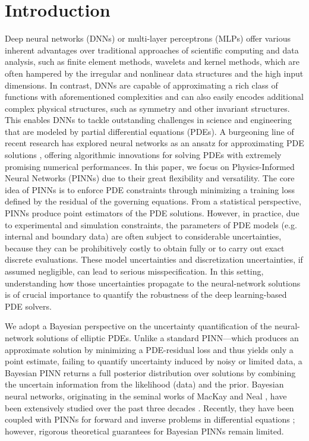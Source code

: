 \documentclass{article}
\theoremstyle{plain}
\theoremstyle{definition}
\theoremstyle{remark}
\begin{document}
\section{Introduction}
Deep neural networks (DNNs) or multi-layer perceptrons (MLPs) offer various inherent advantages over traditional approaches of scientific computing and data analysis, such as finite element methods, wavelets and kernel methods, which are often hampered by the irregular and nonlinear data structures and the high input dimensions. In contrast, DNNs are capable of approximating a rich class of functions with aforementioned complexities and  can also easily encodes additional complex physical structures, such as  symmetry and other invariant structures. This enables DNNs to tackle outstanding challenges in science and engineering that are modeled by  partial differential equations (PDEs). A  burgeoning line of recent research has explored neural networks as an ansatz for approximating  PDE solutions \cite{yu2018deep,raissi19,sirignano2018dgm,zang2020weak}, offering  algorithmic innovations for solving
 PDEs with extremely promising numerical performances. In this paper, we focus on  Physics-Informed Neural Networks (PINNs) \cite{raissi19} due to their great flexibility and versatility. The core idea of PINNs is to enforce PDE constraints through minimizing a training loss defined by the residual of the governing equations. From a statistical perspective, PINNs produce point estimators of the PDE solutions. However, in practice, due to experimental and simulation constraints, the parameters of
PDE models (e.g. internal and boundary data) are often subject to considerable uncertainties,
because they can be prohibitively costly to obtain fully or to carry out exact discrete
evaluations. These model uncertainties and discretization uncertainties, if assumed negligible, 
can lead to serious misspecification. In this setting, understanding
how those uncertainties propagate to the neural-network solutions is of crucial
importance to quantify the robustness of the deep learning-based PDE  solvers. 

We adopt a Bayesian  perspective on the uncertainty quantification of the
neural-network solutions of elliptic PDEs. Unlike a standard PINN—which produces an approximate solution by minimizing a PDE-residual loss and thus yields only a point estimate, failing to quantify uncertainty induced by noisy or limited data, a Bayesian PINN returns a full posterior distribution over solutions by combining the uncertain information from the likelihood (data) and the prior. Bayesian neural networks, originating in the seminal works of MacKay   \cite{mackay1995probable} and Neal  \cite{neal1995bayesian}, have been extensively studied over the past three decades   \cite{lampinen2001bayesian,titterington2004bayesian,graves2011practical}. Recently, they have been coupled with PINNs for forward and inverse problems in differential equations \cite{yang2021b}; however, rigorous theoretical guarantees for Bayesian PINNs remain limited.
\end{document}
